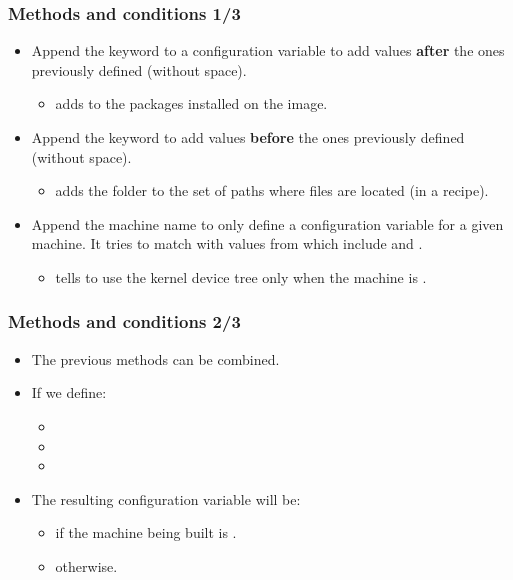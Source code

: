 \begin{frame}
  \frametitle{Methods and conditions 1/3}
  \begin{itemize}
    \item Append the keyword  to a configuration
      variable to add values {\bf after} the ones previously defined
      (without space).
      \begin{itemize}
        \item {} adds
           to the packages installed on the image.
      \end{itemize}
    \item Append the keyword  to add values {\bf
      before} the ones previously defined (without space).
      \begin{itemize}
        \item {}
          adds the folder to the set of paths where files are located
          (in a recipe).
      \end{itemize}
    \item Append the machine name to only define a configuration
      variable for a given machine. It tries to match with values from
       which include  and
      .
      \begin{itemize}
        \item {}
          tells to use the kernel device tree 
          only when the machine is .
      \end{itemize}
  \end{itemize}
\end{frame}

\begin{frame}
  \frametitle{Methods and conditions 2/3}
  \begin{itemize}
    \item The previous methods can be combined.
    \item If we define:
      \begin{itemize}
        \item {}
        \item {}
        \item {}
      \end{itemize}
    \item The resulting configuration variable will be:
      \begin{itemize}
        \item {} if the machine being built is
          .
        \item {}
          otherwise.
      \end{itemize}
  \end{itemize}
\end{frame}


